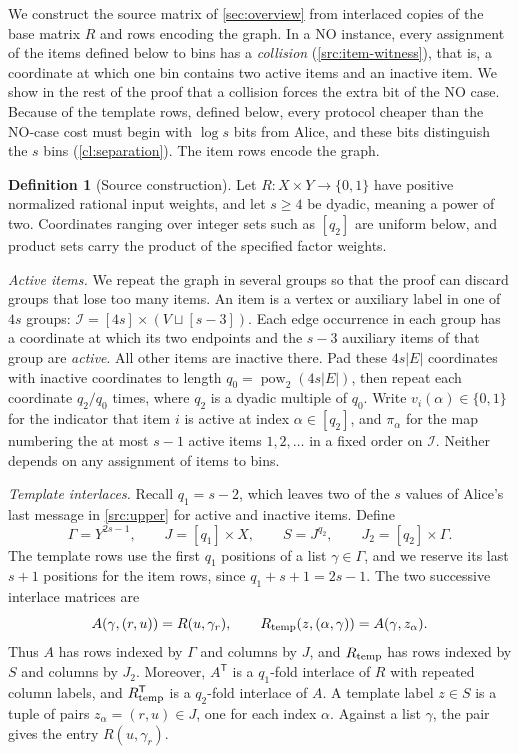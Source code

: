\documentclass[11pt,letterpaper]{article} \usepackage[utf8]{inputenc}
\theoremstyle{plain} \newtheorem{theorem}{Theorem}[section]
\theoremstyle{definition} \newaliascnt{definition}{theorem}
\newtheorem{definition}[definition]{Definition} \aliascntresetthe{definition}
\begin{document}
We construct the source matrix of \cref{sec:overview} from interlaced copies
of the base matrix $R$ and rows encoding the graph. In a NO instance, every
assignment of the items defined below to bins has a \emph{collision}
(\cref{src:item-witness}), that is, a coordinate at which one
bin contains two active items and an inactive item. We show in the rest of
the proof that a collision forces the extra bit of the NO case. Because of
the template rows, defined below, every protocol cheaper than the NO-case cost
must begin with $\log s$ bits from Alice, and these bits distinguish the $s$
bins (\cref{cl:separation}). The item rows encode the graph.

\begin{definition}[Source construction]
\label{def:source-matrix}
Let \(R:X\times Y\to\{0,1\}\) have positive normalized rational input weights, and let
\(s\ge4\) be dyadic, meaning a power of two. Coordinates ranging over integer sets such as \([q_2]\) are uniform below,
and product sets carry the product of the specified factor weights.

\smallskip\noindent\textit{Active items.}
We repeat the graph in several groups so that the proof can discard groups
that lose too many items.
An item is a vertex or auxiliary label in one of \(4s\) groups:
\(\mathcal I=[4s]\times(V\sqcup[s-3])\).
Each edge occurrence in each group has a coordinate at which its two
endpoints and the \(s-3\) auxiliary items of that group are \emph{active}.
All other items are inactive there.
Pad these \(4s|E|\) coordinates with inactive coordinates to length
\(q_0=\operatorname{pow}_2(4s|E|)\), then repeat each coordinate
\(q_2/q_0\) times, where \(q_2\) is a dyadic multiple of \(q_0\).
Write \(v_i(\alpha)\in\{0,1\}\) for the indicator that item \(i\) is active
at index \(\alpha\in[q_2]\), and \(\pi_\alpha\) for the map numbering the at most
\(s-1\) active items \(1,2,\ldots\) in a fixed order on \(\mathcal I\).
Neither depends on any assignment of items to bins.

\smallskip\noindent\textit{Template interlaces.}
Recall \(q_1=s-2\), which leaves two of the \(s\) values of Alice's last
message in \cref{src:upper} for active and inactive items.
Define
\[
\Gamma=Y^{2s-1},\qquad J=[q_1]\times X,\qquad S=J^{q_2},\qquad
J_2=[q_2]\times\Gamma.
\]
The template rows use the first \(q_1\) positions of a list
\(\gamma\in\Gamma\), and we reserve its last \(s+1\) positions for the item
rows, since \(q_1+s+1=2s-1\). The two successive interlace matrices are
\[
A(\gamma,(r,u))=R(u,\gamma_r),\qquad
R_{\rm temp}(z,(\alpha,\gamma))=A(\gamma,z_\alpha).
\]
Thus $A$ has rows indexed by $\Gamma$ and columns by $J$, and $R_{\rm temp}$
has rows indexed by $S$ and columns by $J_2$. Moreover, $A^{\mathsf T}$ is a
$q_1$-fold interlace of $R$ with repeated column labels,
and $R_{\rm temp}^{\mathsf T}$ is a $q_2$-fold interlace of $A$. A template label \(z\in S\)
is a tuple of pairs \(z_\alpha=(r,u)\in J\), one for each index \(\alpha\).
Against a list \(\gamma\), the pair gives the entry \(R(u,\gamma_r)\).


\end{definition}
\end{document}
